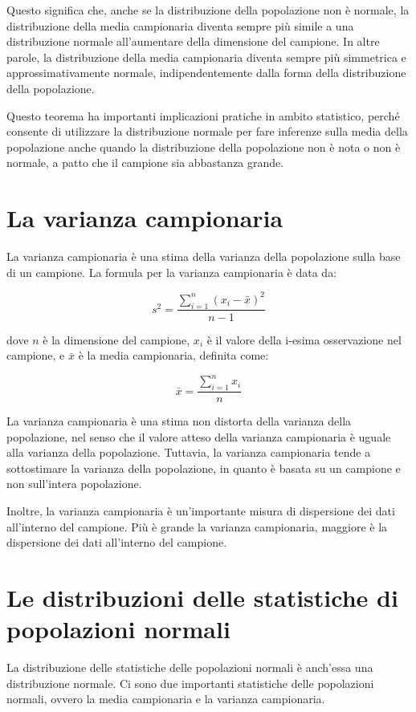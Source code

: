 Questo significa che, anche se la distribuzione della popolazione non è normale, la distribuzione della media campionaria diventa sempre più simile a una distribuzione normale all'aumentare della dimensione del campione. In altre parole, la distribuzione della media campionaria diventa sempre più simmetrica e approssimativamente normale, indipendentemente dalla forma della distribuzione della popolazione.

Questo teorema ha importanti implicazioni pratiche in ambito statistico, perché consente di utilizzare la distribuzione normale per fare inferenze sulla media della popolazione anche quando la distribuzione della popolazione non è nota o non è normale, a patto che il campione sia abbastanza grande.

\section{La varianza campionaria}
La varianza campionaria è una stima della varianza della popolazione sulla base di un campione. La formula per la varianza campionaria è data da:

$$ s^2 = \frac{\sum_{i=1}^n (x_i - \bar{x})^2}{n-1} $$

dove $n$ è la dimensione del campione, $x_i$ è il valore della i-esima osservazione nel campione, e $\bar{x}$ è la media campionaria, definita come:

$$ \bar{x} = \frac{\sum_{i=1}^n x_i}{n} $$

La varianza campionaria è una stima non distorta della varianza della popolazione, nel senso che il valore atteso della varianza campionaria è uguale alla varianza della popolazione. Tuttavia, la varianza campionaria tende a sottostimare la varianza della popolazione, in quanto è basata su un campione e non sull'intera popolazione. 

Inoltre, la varianza campionaria è un'importante misura di dispersione dei dati all'interno del campione. Più è grande la varianza campionaria, maggiore è la dispersione dei dati all'interno del campione.

\section{Le distribuzioni delle statistiche di popolazioni normali}
La distribuzione delle statistiche delle popolazioni normali è anch'essa una distribuzione normale. Ci sono due importanti statistiche delle popolazioni normali, ovvero la media campionaria e la varianza campionaria.

